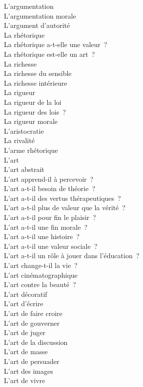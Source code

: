 \documentclass[a4paper,12pt]{article}
\begin{document}
L'argumentation \\
L'argumentation morale \\
L'argument d'autorité \\
La rhétorique \\
La rhétorique a-t-elle une valeur ? \\
La rhétorique est-elle un art ? \\
La richesse \\
La richesse du sensible \\
La richesse intérieure \\
La rigueur \\
La rigueur de la loi \\
La rigueur des lois ? \\
La rigueur morale \\
L'aristocratie \\
La rivalité \\
L'arme rhétorique \\
L'art \\
L'art abstrait \\
L'art apprend-il à percevoir ? \\
L'art a-t-il besoin de théorie ? \\
L'art a-t-il des vertus thérapeutiques ? \\
L'art a-t-il plus de valeur que la vérité ? \\
L'art a-t-il pour fin le plaisir ? \\
L'art a-t-il une fin morale ? \\
L'art a-t-il une histoire ? \\
L'art a-t-il une valeur sociale ? \\
L'art a-t-il un rôle à jouer dans l'éducation ? \\
L'art change-t-il la vie ? \\
L'art cinématographique \\
L'art contre la beauté ? \\
L'art décoratif \\
L'art d'écrire \\
L'art de faire croire \\
L'art de gouverner \\
L'art de juger \\
L'art de la discussion \\
L'art de masse \\
L'art de persuader \\
L'art des images \\
L'art de vivre \\
\end{document}
